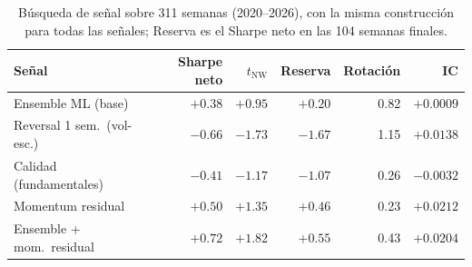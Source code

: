\begin{table}[htbp]
\centering
\caption{Búsqueda de señal sobre 311 semanas (2020--2026), con la misma construcción para
todas las señales; Reserva es el Sharpe neto en las 104 semanas finales.}
\label{tab:rq2-signal-search}
\small
\begin{tabular}{lrrrrr}
\toprule
Señal & Sharpe neto & $t_{\text{NW}}$ & Reserva & Rotación & IC \\
\midrule
Ensemble ML (base) & $+0.38$ & $+0.95$ & $+0.20$ & 0.82 & $+0.0009$ \\
Reversal 1 sem.\ (vol-esc.) & $-0.66$ & $-1.73$ & $-1.67$ & 1.15 & $+0.0138$ \\
Calidad (fundamentales) & $-0.41$ & $-1.17$ & $-1.07$ & 0.26 & $-0.0032$ \\
Momentum residual & $+0.50$ & $+1.35$ & $+0.46$ & 0.23 & $+0.0212$ \\
Ensemble + mom.\ residual & $+0.72$ & $+1.82$ & $+0.55$ & 0.43 & $+0.0204$ \\
\bottomrule
\end{tabular}
\end{table}
